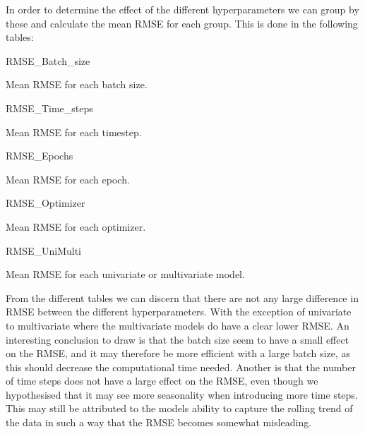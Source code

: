 In order to determine the effect of the different hyperparameters we can group by these and calculate the mean RMSE for each group. This is done in the following tables:
\begin{table}[H]
    \centering
    {RMSE_Batch_size}
    \caption{Mean RMSE for each batch size.}\label{tab:RMSE_batch_size}
\end{table}

\begin{minipage}{.5\textwidth\relax}
    \begin{table}[H]
        \centering
        {RMSE_Time_steps}
        \caption{Mean RMSE for each timestep.}\label{tab:RMSE_Tensorflow_groupby_timesteps}
    \end{table}
    \end{minipage}%
\begin{minipage}{.5\textwidth\relax}
\begin{table}[H]
    \centering
    {RMSE_Epochs}
    \caption{Mean RMSE for each epoch.}\label{tab:RMSE_epochs}
\end{table}
\end{minipage}%

\begin{minipage}{.5\textwidth\relax}
\begin{table}[H]
    \centering
    {RMSE_Optimizer}
    \caption{Mean RMSE for each optimizer.}\label{tab:RMSE_optimizer}
\end{table}
\end{minipage}%
\begin{minipage}{.5\textwidth\relax}
\begin{table}[H]
    \centering
    {RMSE_UniMulti}
    \caption{Mean RMSE for each univariate or multivariate model.}\label{tab:RMSE_uni_multi}
\end{table}
\end{minipage}%

From the different tables we can discern that there are not any large difference in RMSE between the different hyperparameters. With the exception of univariate to multivariate where the multivariate models do have a clear lower RMSE. An interesting conclusion to draw is that the batch size seem to have a small effect on the RMSE, and it may therefore be more efficient with a large batch size, as this should decrease the computational time needed. Another is that the number of time steps does not have a large effect on the RMSE, even though we hypothesised that it may see more seasonality when introducing more time steps. This may still be attributed to the models ability to capture the rolling trend of the data in such a way that the RMSE becomes somewhat misleading.

